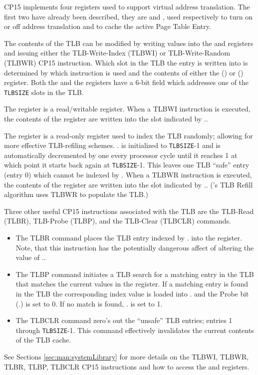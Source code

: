 CP15 implements four registers used to support virtual address translation.
The first two have already been described, they are  and , used respectively to turn on or off address translation and to cache the active Page Table Entry.

The contents of the TLB can be modified by writing values into the  and  registers and issuing either the TLB-Write-Index (TLBWI) or TLB-Write-Random (TLBWR) CP15 instruction. 
Which slot in the TLB the entry is written into is determined by which instruction is used and the contents of either the  () or  () register.
Both the  and the  registers have a 6-bit  field which addresses one of the \texttt{TLBSIZE} slots in the TLB.


The  register is a read/writable register. When a TLBWI instruction is executed, the contents of the  register are written into the slot indicated by ..


The  register is a read-only register used to index the TLB randomly; allowing for more effective TLB-refiling schemes. 
. is initialized to \texttt{TLBSIZE}-1 and is automatically decremented by one every processor cycle until it reaches 1 at which point it starts back again at \texttt{TLBSIZE}-1.
This leaves one TLB “safe” entry (entry 0) which cannot be indexed by . 
When a TLBWR instruction is executed, the contents of the  register are written into the slot indicated by .. (\uarm{}’s TLB Refill algorithm uses TLBWR to populate the TLB.)

Three other useful CP15 instructions associated with the TLB are the TLB-Read (TLBR), TLB-Probe (TLBP), and the TLB-Clear (TLBCLR) commands.
\begin{itemize}
	\item The TLBR command places the TLB entry indexed by . into the  register. 
		Note, that this instruction has the potentially dangerous affect of altering the value of ..
	\item The TLBP command initiates a TLB search for a matching entry in the TLB that matches the current values in the  register. 
		If a matching entry is found in the TLB the corresponding index value is loaded into . and the Probe bit (.) is set to 0. If no match is found, . is set to 1.
	\item The TLBCLR command zero’s out the “unsafe” TLB entries; entries 1 through \texttt{TLBSIZE}-1.
		This command effectively invalidates the current contents of the TLB cache.
\end{itemize}

See Sections \ref{sec:man:systemLibrary} for more details on the TLBWI, TLBWR, TLBR, TLBP, TLBCLR CP15 instructions and how to access the  and  registers.

